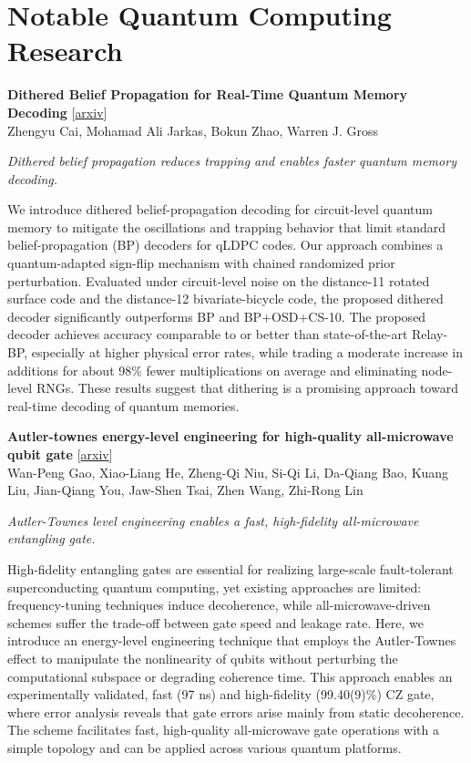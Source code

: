\documentclass[12pt,letterpaper]{article}
\begin{document}
\section*{Notable Quantum Computing Research}
{\small\textbf{Dithered Belief Propagation for Real-Time Quantum Memory Decoding}} {\scriptsize[\href{https://arxiv.org/abs/2611.07144}{arxiv}]}\nopagebreak\\
{\scriptsize Zhengyu Cai, Mohamad Ali Jarkas, Bokun Zhao, Warren J. Gross}\nopagebreak\\[2pt]
{\footnotesize\textit{Dithered belief propagation reduces trapping and enables faster quantum memory decoding.}\par}\nopagebreak
{\footnotesize We introduce dithered belief-propagation decoding for circuit-level quantum memory to mitigate the oscillations and trapping behavior that limit standard belief-propagation (BP) decoders for qLDPC codes. Our approach combines a quantum-adapted sign-flip mechanism with chained randomized prior perturbation. Evaluated under circuit-level noise on the distance-11 rotated surface code and the distance-12 bivariate-bicycle code, the proposed dithered decoder significantly outperforms BP and BP+OSD+CS-10. The proposed decoder achieves accuracy comparable to or better than state-of-the-art Relay-BP, especially at higher physical error rates, while trading a moderate increase in additions for about 98\% fewer multiplications on average and eliminating node-level RNGs. These results suggest that dithering is a promising approach toward real-time decoding of quantum memories.\par}
\medskip
{\small\textbf{Autler-townes energy-level engineering for high-quality all-microwave qubit gate}} {\scriptsize[\href{https://arxiv.org/abs/2611.07967}{arxiv}]}\nopagebreak\\
{\scriptsize Wan-Peng Gao, Xiao-Liang He, Zheng-Qi Niu, Si-Qi Li, Da-Qiang Bao, Kuang Liu, Jian-Qiang You, Jaw-Shen Tsai, Zhen Wang, Zhi-Rong Lin}\nopagebreak\\[2pt]
{\footnotesize\textit{Autler-Townes level engineering enables a fast, high-fidelity all-microwave entangling gate.}\par}\nopagebreak
{\footnotesize High-fidelity entangling gates are essential for realizing large-scale fault-tolerant superconducting quantum computing, yet existing approaches are limited: frequency-tuning techniques induce decoherence, while all-microwave-driven schemes suffer the trade-off between gate speed and leakage rate. Here, we introduce an energy-level engineering technique that employs the Autler-Townes effect to manipulate the nonlinearity of qubits without perturbing the computational subspace or degrading coherence time. This approach enables an experimentally validated, fast (97 ns) and high-fidelity (99.40(9)\%) CZ gate, where error analysis reveals that gate errors arise mainly from static decoherence. The scheme facilitates fast, high-quality all-microwave gate operations with a simple topology and can be applied across various quantum platforms.\par}
\end{document}
